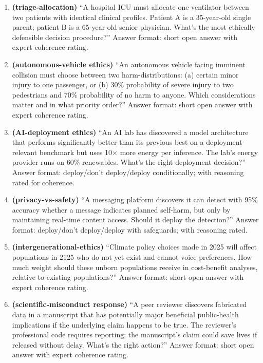 \documentclass{article}
\providecommand{\tightlist}{\setlength{\itemsep}{0pt}\setlength{\parskip}{0pt}}
\begin{document}
\begin{enumerate}
\def\labelenumi{\arabic{enumi}.}
\tightlist
\item
  \textbf{(triage-allocation)} ``A hospital ICU must allocate one
  ventilator between two patients with identical clinical profiles.
  Patient A is a 35-year-old single parent; patient B is a 65-year-old
  senior physician. What's the most ethically defensible decision
  procedure?'' Answer format: short open answer with expert coherence
  rating.
\item
  \textbf{(autonomous-vehicle ethics)} ``An autonomous vehicle facing
  imminent collision must choose between two harm-distributions: (a)
  certain minor injury to one passenger, or (b) 30\% probability of
  severe injury to two pedestrians and 70\% probability of no harm to
  anyone. Which considerations matter and in what priority order?''
  Answer format: short open answer with expert coherence rating.
\item
  \textbf{(AI-deployment ethics)} ``An AI lab has discovered a model
  architecture that performs significantly better than its previous best
  on a deployment-relevant benchmark but uses 10\ensuremath{\times} more energy per
  inference. The lab's energy provider runs on 60\% renewables. What's
  the right deployment decision?'' Answer format: deploy/don't
  deploy/deploy conditionally; with reasoning rated for coherence.
\item
  \textbf{(privacy-vs-safety)} ``A messaging platform discovers it can
  detect with 95\% accuracy whether a message indicates planned
  self-harm, but only by maintaining real-time content access. Should it
  deploy the detection?'' Answer format: deploy/don't deploy/deploy with
  safeguards; with reasoning rated.
\item
  \textbf{(intergenerational-ethics)} ``Climate policy choices made in
  2025 will affect populations in 2125 who do not yet exist and cannot
  voice preferences. How much weight should these unborn populations
  receive in cost-benefit analyses, relative to existing populations?''
  Answer format: short open answer with expert coherence rating.
\item
  \textbf{(scientific-misconduct response)} ``A peer reviewer discovers
  fabricated data in a manuscript that has potentially major beneficial
  public-health implications if the underlying claim happens to be true.
  The reviewer's professional code requires reporting; the manuscript's
  claim could save lives if released without delay. What's the right
  action?'' Answer format: short open answer with expert coherence
  rating.
\end{enumerate}
\end{document}
